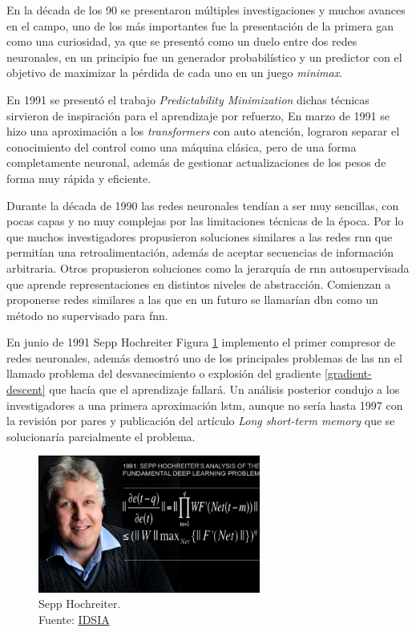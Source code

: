 En la década de los 90 se presentaron múltiples investigaciones y muchos avances en el campo, uno de los más importantes fue la presentación de la primera \acrshort{gan} como una curiosidad, ya que se presentó como un duelo entre dos redes neuronales, en un principio fue un generador probabilístico y un predictor con el objetivo de maximizar la pérdida de cada uno en un juego \textit{minimax}.

En 1991 se presentó el trabajo \textit{Predictability Minimization} \cite{urgen1991learning} dichas técnicas sirvieron de inspiración para el aprendizaje por refuerzo,
En marzo de 1991 se hizo una aproximación a los \textit{transformers} con auto atención, lograron separar el conocimiento del control como una máquina clásica, pero de una forma completamente neuronal, además de gestionar actualizaciones de los pesos de forma muy rápida y eficiente.

Durante la década de 1990 las redes neuronales tendían a ser muy sencillas, con pocas capas y no muy complejas por las limitaciones técnicas de la época.
Por lo que muchos investigadores propusieron soluciones similares a las redes \acrshort{rnn} que permitían una retroalimentación, además de aceptar secuencias de información arbitraria.
Otros propusieron soluciones como la jerarquía de \acrshort{rnn} autosupervisada que aprende representaciones en distintos niveles de abstracción.
Comienzan a proponerse redes similares a las que en un futuro se llamarían \acrshort{dbn} como un método no supervisado para \acrshort{fnn}.

En junio de 1991 {Sepp Hochreiter} Figura \ref{fig:sepp-hochreiter} implemento el primer compresor de redes neuronales, además demostró uno de los principales problemas de las \acrshort{nn} el llamado problema del desvanecimiento o explosión del gradiente \ref{gradient-descent} que hacía que el aprendizaje fallará.
Un análisis posterior condujo a los investigadores a una primera aproximación \acrshort{lstm}, aunque no sería hasta 1997 con la revisión por pares y publicación del artículo \textit{Long short-term memory} \cite{hochreiter1997long} que se solucionaría parcialmente el problema.

\begin{figure}[H]
    \centering
    \includegraphics[width=0.65\textwidth]{figures/Sepp Hochreiter.jpg}
    \caption{Sepp Hochreiter.\\Fuente: \href{https://people.idsia.ch/~juergen/fundamentaldeeplearningproblem.html}{IDSIA}}
    \label{fig:sepp-hochreiter}
\end{figure}

